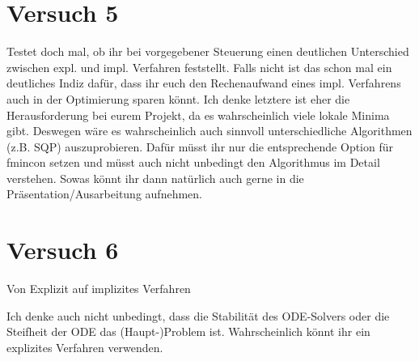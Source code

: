 










\newpage
\section{Versuch 5}
Testet doch mal, ob ihr bei vorgegebener Steuerung einen deutlichen Unterschied zwischen expl. und impl. Verfahren feststellt. Falls nicht ist das schon mal ein deutliches Indiz dafür, dass ihr euch den Rechenaufwand eines impl. Verfahrens auch in der Optimierung sparen könnt. Ich denke letztere ist eher die Herausforderung bei eurem Projekt, da es wahrscheinlich viele lokale Minima gibt. Deswegen wäre es wahrscheinlich auch sinnvoll unterschiedliche Algorithmen (z.B. SQP) auszuprobieren. Dafür müsst ihr nur die entsprechende Option für fmincon setzen und müsst auch nicht unbedingt den Algorithmus im Detail verstehen. Sowas könnt ihr dann natürlich auch gerne in die Präsentation/Ausarbeitung aufnehmen.







\newpage
\section{Versuch 6}
Von Explizit auf implizites Verfahren

Ich denke auch nicht unbedingt, dass die Stabilität des ODE-Solvers oder die Steifheit der ODE das (Haupt-)Problem ist. Wahrscheinlich könnt ihr ein explizites Verfahren verwenden.


